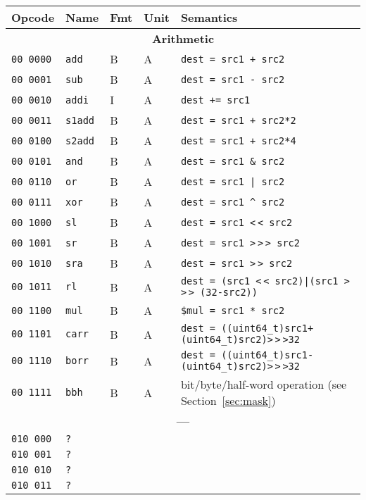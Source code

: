 \documentclass[10pt,DIV12]{scrartcl}
\newcommand{\shl}{\textless$\,\!$\textless}
\newcommand{\shr}{\textgreater$\,\!$\textgreater$\,\!$\textgreater}
\newcommand{\ashr}{\textgreater$\,\!$\textgreater}
\begin{document}
\begin{longtable}{llllp{}}
\toprule
Opcode & Name & Fmt & Unit & Semantics \\
\midrule
\multicolumn{5}{c}{\textsf{\textbf{Arithmetic}}} \\
\cmidrule{1-5}
\texttt{00 0000} & \texttt{add} & B & A & \texttt{dest = src1 + src2} \\
\texttt{00 0001} & \texttt{sub} & B & A & \texttt{dest = src1 - src2} \\
\texttt{00 0010} & \texttt{addi} & I & A & \texttt{dest += src1} \\
\texttt{00 0011} & \texttt{s1add} & B & A & \texttt{dest = src1 + src2*2} \\
\texttt{00 0100} & \texttt{s2add} & B & A & \texttt{dest = src1 + src2*4} \\
\texttt{00 0101} & \texttt{and} & B & A & \texttt{dest = src1 \& src2} \\
\texttt{00 0110} & \texttt{or} & B & A & \texttt{dest = src1 | src2} \\
\texttt{00 0111} & \texttt{xor} & B & A & \texttt{dest = src1 \textasciicircum{} src2} \\
\texttt{00 1000} & \texttt{sl} & B & A & \texttt{dest = src1 \shl{} src2} \\
\texttt{00 1001} & \texttt{sr} & B & A & \texttt{dest = src1 \shr{} src2} \\
\texttt{00 1010} & \texttt{sra} & B & A & \texttt{dest = src1 \ashr{} src2} \\
\texttt{00 1011} & \texttt{rl} & B & A & \texttt{dest = (src1 \shl{} src2)|(src1 \shr{} (32-src2))} \\
\texttt{00 1100} & \texttt{mul} & B & A & \texttt{\$mul = src1 * src2} \\
\texttt{00 1101} & \texttt{carr} & B & A & \texttt{dest = ((uint64\_t)src1+(uint64\_t)src2)\shr{}32} \\
\texttt{00 1110} & \texttt{borr} & B & A & \texttt{dest = ((uint64\_t)src1-(uint64\_t)src2)\shr{}32} \\
\texttt{00 1111} & \texttt{bbh} & B & A & bit/byte/half-word operation (see Section~\ref{sec:mask}) \\
\midrule
\multicolumn{5}{c}{\textbf{---}} \\
\cmidrule{1-5}
\texttt{010 000} & \texttt{?} & & & \\
\texttt{010 001} & \texttt{?} & & & \\
\texttt{010 010} & \texttt{?} & & & \\
\texttt{010 011} & \texttt{?} & & & \\

\end{longtable}
\end{document}
